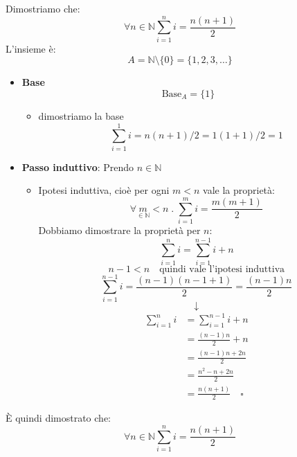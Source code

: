 \documentclass[a4paper]{article}
\begin{document}
\begin{example}
  Dimostriamo che:
  \[
    \forall n \in \mathbb{N} \sum_{i=1}^{n} i = \frac{n(n+1)}{2}
  \] 
  L'insieme è:
  \[
    A = \mathbb{N} \setminus \{0\} = \{1,2,3, \ldots\}
  \] 
  \begin{itemize}
    \item \textbf{Base}
      \[
        \text{Base}_A = \{1\}
      \] 
      \begin{itemize}
        \item dimostriamo la base
          \[
            \sum_{i=1}^{1} i = n(n+1)/2 = 1(1+1)/2 = 1
          \] 
      \end{itemize}

    \item \textbf{Passo induttivo}:
      \vspace{1em}
      \noindent
      Prendo \( n \in \mathbb{N} \) 
      \begin{itemize}
        \item Ipotesi induttiva, cioè per ogni \( m < n \) vale la proprietà:
          \[
            \forall \underset{\in \mathbb{N}}{m} < n \;.\; \sum_{i=1}^{m} i =
            \frac{m(m+1)}{2}
          \] 
          Dobbiamo dimostrare la proprietà per \( n \):
          \[
            \sum_{i=1}^{n} i = \sum_{i=1}^{n-1} i + n
          \] 
          \[
            n - 1 < n \quad \text{quindi vale l'ipotesi induttiva}
          \] 
          \[
            \sum_{i=1}^{n-1} i = \frac{(n-1)(n-1+1)}{2} = \frac{(n-1)n}{2}
          \] 
          \[
            \downarrow
          \] 
          \[
            \begin{aligned}
              \sum_{i=1}^{n} i &= \sum_{i=1}^{n-1} i + n\\
                               &= \frac{(n-1)n}{2} + n\\
                               &= \frac{(n-1)n + 2n}{2}\\
                               &= \frac{n^2 - n + 2n}{2}\\
                               &= \frac{n(n+1)}{2} \quad \square
            \end{aligned}
          \] 
      \end{itemize}
  \end{itemize}
  È quindi dimostrato che:
  \[
    \forall n \in \mathbb{N} \sum_{i=1}^{n} i = \frac{n(n+1)}{2}
  \]
\end{example}
\end{document}
